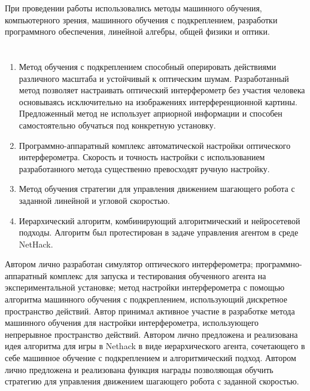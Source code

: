 {\methods} При проведении работы использовались методы машинного обучения, компьютерного зрения, машинного обучения с подкреплением, разработки программного обеспечения, линейной алгебры, общей физики и оптики. 

\ifresume
\section*{}
\fi

{}
\begin{enumerate}[beginpenalty=10000] %
  \item Метод обучения с подкреплением способный оперировать действиями различного масштаба и устойчивый к оптическим шумам. Разработанный метод позволяет настраивать оптический интерферометр без участия человека основываясь исключительно на изображениях интерференционной картины. Предложенный метод не использует априорной информации и способен самостоятельно обучаться под конкретную установку.
  \item Программно-аппаратный комплекс автоматической настройки оптического интерферометра. Скорость и точность настройки с использованием разработанного метода существенно превосходят ручную настройку. 
  \item Метод обучения стратегии для управления движением шагающего робота с заданной линейной и угловой скоростью.
  \item Иерархический алгоритм, комбинирующий алгоритмический и нейросетевой подходы. Алгоритм был протестирован в задаче управления агентом в среде NetHack.
\end{enumerate}

{\contribution} Автором лично разработан симулятор оптического интерферометра; программно-аппаратный комплекс для запуска и тестирования обученного агента на экспериментальной установке; метод настройки интерферометра с помощью алгоритма машинного обучения с подкреплением, использующий дискретное пространство действий. Автор принимал активное участие в разработке метода машинного обучения для настройки интерферометра, использующего непрерывное пространство действий. Автором лично предложена и реализована идея алгоритма для игры в Nethack в виде иерархического агента, сочетающего в себе машинное обучение с подкреплением и алгоритмический подход. Автором лично предложена и реализована функция награды позволяющая обучить стратегию для управления движением шагающего робота с заданной скоростью. 


